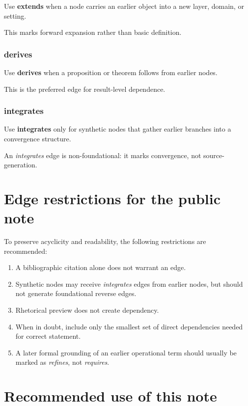 \documentclass[11pt,a4paper]{article}
\begin{document}
	Use \textbf{extends} when a node carries an earlier object into a new layer, domain, or setting.
	
	This marks forward expansion rather than basic definition.
	
	\subsubsection*{derives}
	
	Use \textbf{derives} when a proposition or theorem follows from earlier nodes.
	
	This is the preferred edge for result-level dependence.
	
	\subsubsection*{integrates}
	
	Use \textbf{integrates} only for synthetic nodes that gather earlier branches into a convergence
	structure.
	
	An \emph{integrates} edge is non-foundational: it marks convergence, not source-generation.
	
	\section{Edge restrictions for the public note}
	
	To preserve acyclicity and readability, the following restrictions are recommended:
	
	\begin{enumerate}[leftmargin=2em]
		\item A bibliographic citation alone does not warrant an edge.
		\item Synthetic nodes may receive \emph{integrates} edges from earlier nodes, but should not
		generate foundational reverse edges.
		\item Rhetorical preview does not create dependency.
		\item When in doubt, include only the smallest set of direct dependencies needed for correct statement.
		\item A later formal grounding of an earlier operational term should usually be marked as
		\emph{refines}, not \emph{requires}.
	\end{enumerate}
	
	\section{Recommended use of this note}
	
\end{document}

